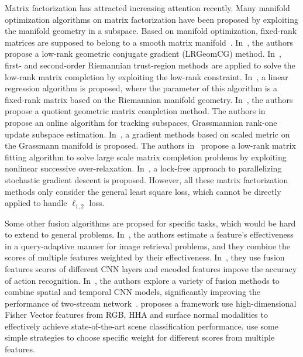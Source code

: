 \documentclass[10pt,twocolumn,letterpaper]{article}
\begin{document}
Matrix factorization has attracted increasing attention recently.
Many manifold optimization algorithms on matrix factorization have been proposed by exploiting the manifold geometry in a subspace.
Based on manifold optimization, fixed-rank matrices are supposed to belong to a smooth matrix manifold~\cite{Absil2008OAMM,vandereycken2013lowrank}.
In~\cite{vandereycken2013lowrank}, the authors propose a low-rank geometric conjugate gradient (LRGeomCG) method.
In~\cite{rtrmc2011boumal}, first- and second-order Riemannian trust-region methods are applied to solve the low-rank matrix completion by exploiting the low-rank constraint.
In~\cite{Bonnabel2011}, a linear regression algorithm is proposed, where the parameter of this algorithm is a fixed-rank matrix based on the Riemannian manifold geometry.
In~\cite{Mishra2012}, the authors propose a quotient geometric matrix completion method.
The authors in~\cite{grouse2010Balzano} propose an online algorithm for tracking subspaces, Grassmannian rank-one update subspace estimation.
In~\cite{ngonips2012scaled}, a gradient methods based on scaled metric on the Grassmann manifold is proposed.
The authors in~\cite{Wen2012} propose a low-rank matrix fitting algorithm to solve large scale matrix completion problems by exploiting nonlinear successive over-relaxation.
In~\cite{RechtNIPS2011hogwild}, a lock-free approach to parallelizing stochastic gradient descent is proposed.
However, all these matrix factorization methods only consider the general least square loss, which cannot be directly applied to handle $\ell_{1,2}$ loss.

Some other fusion algorithms are propsed for specific tasks, which would be hard to extend to general problems.
In~\cite{zheng2015query}, the authors estimate a feature’s effectiveness in a query-adaptive manner for image retrieval problems,
and they combine the scores of multiple features weighted by their effectiveness.
In~\cite{zha2015exploiting}, they use fusion features scores of different CNN layers and encoded features impove the accuracy of action recognition.
In~\cite{feichtenhofer2016convolutional}, the authors explore a variety of fusion methods to combine spatial and temporal CNN models, significantly improving the performance of two-stream network~\cite{simonyan2014two}.
\cite{wangmodality} proposes a framework use high-dimensional Fisher Vector features from RGB, HHA and surface normal modalities to effectively achieve state-of-the-art scene classification performance.
\cite{Wang_Transformation,tapaswi2015movieqa,yaohighlight} use some simple strategies to choose specific weight for different scores from multiple features.
\end{document}
